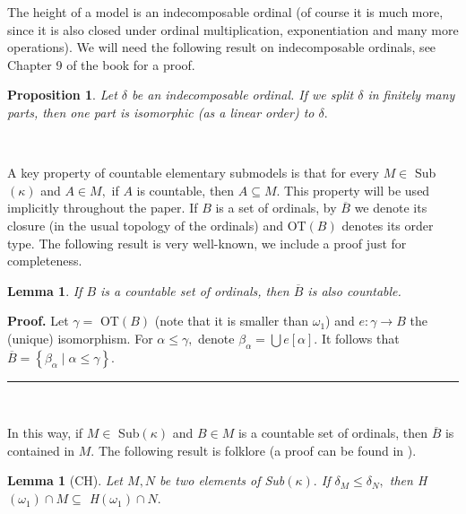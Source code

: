\documentclass{article}%
\newtheorem{lemma}[theorem]{Lemma}
\newtheorem{proposition}[theorem]{Proposition}
\newenvironment{proof}[1][Proof]{\noindent\textbf{#1.} }{\ \rule{0.5em}{0.5em}}
\begin{document}
The height of a model is an indecomposable ordinal (of course it is much more,
since it is also closed under ordinal multiplication, exponentiation and many
more operations). We will need the following result on indecomposable
ordinals, see Chapter 9 of the book \cite{KomjathBook} for a proof.

\begin{proposition}
Let $\delta$ be an indecomposable ordinal. If we split $\delta$ in finitely
many parts, then one part is isomorphic (as a linear order) to $\delta.$
\label{Indescomp}
\end{proposition}

\qquad\qquad\qquad\ \ \ \ 

A key property of countable elementary submodels is that for every $M\in$
\textsf{Sub}$\left(  \kappa\right)  $ and $A\in M,$ if $A$ is countable, then
$A\subseteq M.$ This property will be used implicitly throughout the paper. If
$B$ is a set of ordinals, by $\overline{B}$ we denote its closure (in the
usual topology of the ordinals) and \textsf{OT}$\left(  B\right)  $ denotes
its order type. The following result is very well-known, we include a proof
just for completeness.

\begin{lemma}
If $B$ is a countable set of ordinals, then $\overline{B}$ is also countable.
\end{lemma}

\begin{proof}
Let $\gamma=$ \textsf{OT}$\left(  B\right)  $ (note that it is smaller than
$\omega_{1}$) and $e:\gamma\longrightarrow B$ the (unique) isomorphism. For
$\alpha\leq\gamma,$ denote $\beta_{\alpha}=\bigcup e\left[  \alpha\right]  .$
It follows that $\overline{B}=\left\{  \beta_{\alpha}\mid\alpha\leq
\gamma\right\}  .$
\end{proof}

\qquad\qquad\ \ \ 

In this way, if $M\in$ \textsf{Sub}$\left(  \kappa\right)  $ and $B\in M$ is a
countable set of ordinals, then $\overline{B}$ is contained in $M.$ The
following result is folklore (a proof can be found in
\cite{UltrafiltersinRandomModel}).

\begin{lemma}
[\textsf{CH}]Let $M,N$ be two elements of \textsf{Sub}$\left(  \kappa\right)
.$ If $\delta_{M}\leq\delta_{N},$ then \textsf{H}$\left(  \omega_{1}\right)
\cap M\subseteq$ \textsf{H}$\left(  \omega_{1}\right)  \cap N.$
\label{Lema contencion Hw1}
\end{lemma}
\end{document}
